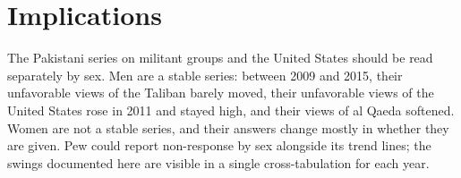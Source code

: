 \documentclass[11pt,letterpaper]{article}
\begin{document}
\section{Implications}

The Pakistani series on militant groups and the United States should be read separately by sex. Men are a stable series: between 2009 and 2015, their unfavorable views of the Taliban barely moved, their unfavorable views of the United States rose in 2011 and stayed high, and their views of al Qaeda softened. Women are not a stable series, and their answers change mostly in whether they are given. Pew could report non-response by sex alongside its trend lines; the swings documented here are visible in a single cross-tabulation for each year.



\end{document}
